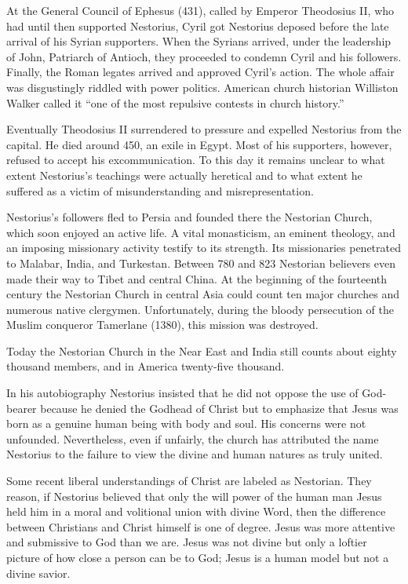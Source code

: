 At the General Council of Ephesus (431), called by Emperor Theodosius II, who had until then
supported Nestorius, Cyril got Nestorius deposed before the late arrival of his Syrian supporters.
When the Syrians arrived, under the leadership of John, Patriarch of Antioch, they proceeded to
condemn Cyril and his followers. Finally, the Roman legates arrived and approved Cyril’s action. The
whole affair was disgustingly riddled with power politics. American church historian Williston
Walker called it “one of the most repulsive contests in church history.”

Eventually Theodosius II surrendered to pressure and expelled Nestorius from the capital. He died
around 450, an exile in Egypt. Most of his supporters, however, refused to accept his
excommunication. To this day it remains unclear to what extent Nestorius’s teachings were actually
heretical and to what extent he suffered as a victim of misunderstanding and misrepresentation.

Nestorius’s followers fled to Persia and founded there the Nestorian Church, which soon enjoyed an
active life. A vital monasticism, an eminent theology, and an imposing missionary activity testify
to its strength. Its missionaries penetrated to Malabar, India, and Turkestan. Between 780 and 823
Nestorian believers even made their way to Tibet and central China. At the beginning of the
fourteenth century the Nestorian Church in central Asia could count ten major churches and numerous
native clergymen. Unfortunately, during the bloody persecution of the Muslim conqueror Tamerlane
(1380), this mission was destroyed.

Today the Nestorian Church in the Near East and India still counts about eighty thousand members,
and in America twenty-five thousand.

In his autobiography Nestorius insisted that he did not oppose the use of God-bearer because he
denied the Godhead of Christ but to emphasize that Jesus was born as a genuine human being with body
and soul. His concerns were not unfounded. Nevertheless, even if unfairly, the church has attributed
the name Nestorius to the failure to view the divine and human natures as truly united.

Some recent liberal understandings of Christ are labeled as Nestorian. They reason, if Nestorius
believed that only the will power of the human man Jesus held him in a moral and volitional union
with divine Word, then the difference between Christians and Christ himself is one of degree. Jesus
was more attentive and submissive to God than we are. Jesus was not divine but only a loftier
picture of how close a person can be to God; Jesus is a human model but not a divine savior.

